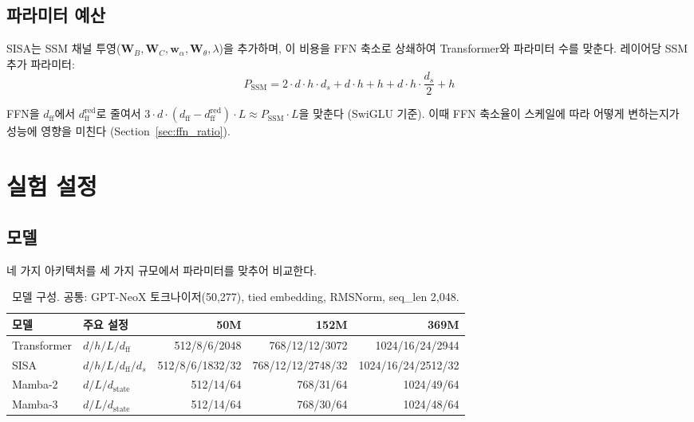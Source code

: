 \documentclass[11pt]{article}
\begin{document}
\subsection{파라미터 예산}

SISA는 SSM 채널 투영($\mathbf{W}_B, \mathbf{W}_C, \mathbf{w}_\alpha, \mathbf{W}_\theta, \lambda$)을 추가하며, 이 비용을 FFN 축소로 상쇄하여 Transformer와 파라미터 수를 맞춘다. 레이어당 SSM 추가 파라미터:
\begin{equation}
P_{\text{SSM}} = 2 \cdot d \cdot h \cdot d_s + d \cdot h + h + d \cdot h \cdot \frac{d_s}{2} + h
\end{equation}

FFN을 $d_{\text{ff}}$에서 $d_{\text{ff}}^{\text{red}}$로 줄여서 $3 \cdot d \cdot (d_{\text{ff}} - d_{\text{ff}}^{\text{red}}) \cdot L \approx P_{\text{SSM}} \cdot L$을 맞춘다 (SwiGLU 기준). 이때 FFN 축소율이 스케일에 따라 어떻게 변하는지가 성능에 영향을 미친다 (Section~\ref{sec:ffn_ratio}).

\section{실험 설정}

\subsection{모델}

네 가지 아키텍처를 세 가지 규모에서 파라미터를 맞추어 비교한다.

\begin{table}[h]
\centering\small
\caption{모델 구성. 공통: GPT-NeoX 토크나이저(50,277), tied embedding, RMSNorm, seq\_len 2,048.}
\label{tab:configs}
\begin{tabular}{llrrr}
\toprule
\textbf{모델} & \textbf{주요 설정} & \textbf{50M} & \textbf{152M} & \textbf{369M} \\
\midrule
Transformer & $d/h/L/d_{\text{ff}}$ & 512/8/6/2048 & 768/12/12/3072 & 1024/16/24/2944 \\
SISA & $d/h/L/d_{\text{ff}}/d_s$ & 512/8/6/1832/32 & 768/12/12/2748/32 & 1024/16/24/2512/32 \\
Mamba-2 & $d/L/d_{\text{state}}$ & 512/14/64 & 768/31/64 & 1024/49/64 \\
Mamba-3 & $d/L/d_{\text{state}}$ & 512/14/64 & 768/30/64 & 1024/48/64 \\
\bottomrule
\end{tabular}
\end{table}
\end{document}
